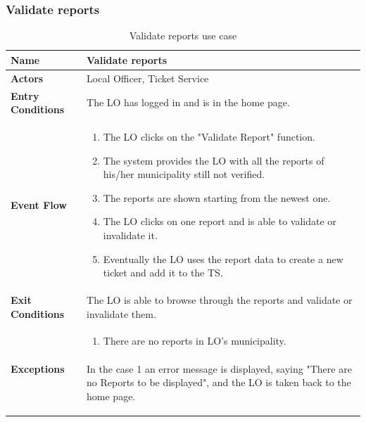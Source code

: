 					\subsubsection{Validate reports}
					\begin{table}[!h]
						\centering
						\vspace{-2mm}
						\begin{tabular}{lp{}}
							\toprule
							\textbf{Name} & \textbf{Validate reports} \\[1mm]
							\midrule
							\textbf{Actors} & Local Officer, Ticket Service \\[1mm]
							\textbf{Entry Conditions} & The LO has logged in and is in the home page. \vspace{1mm}\\
							\textbf{Event Flow} &
							\vspace{-5mm} 
							\begin{enumerate}
								\setlength\itemsep{0.2mm}
								\item The LO clicks on the "Validate Report" function.
								\item The system provides the LO with all the reports of his/her municipality still not verified.
								\item The reports are shown starting from the newest one.
								\item The LO clicks on one report and is able to validate or invalidate it.
								\item Eventually the LO uses the report data to create a new ticket and add it to the TS.
							\end{enumerate} \\
							\textbf{Exit Conditions} & The LO is able to browse through the reports and validate or invalidate them. \vspace{1mm}\\
							\textbf{Exceptions} & 
								\vspace{-5mm} 
								\begin{enumerate}
									\item There are no reports in LO's municipality.
								\end{enumerate}
								\vspace{-7mm}
								\paragraph{}
									In the case 1 an error message is displayed, saying "There are no Reports to be displayed", and the LO is taken back to the home page. \\
							\bottomrule
						\end{tabular}
						\caption{Validate reports use case}
					\end{table}
			\clearpage	
